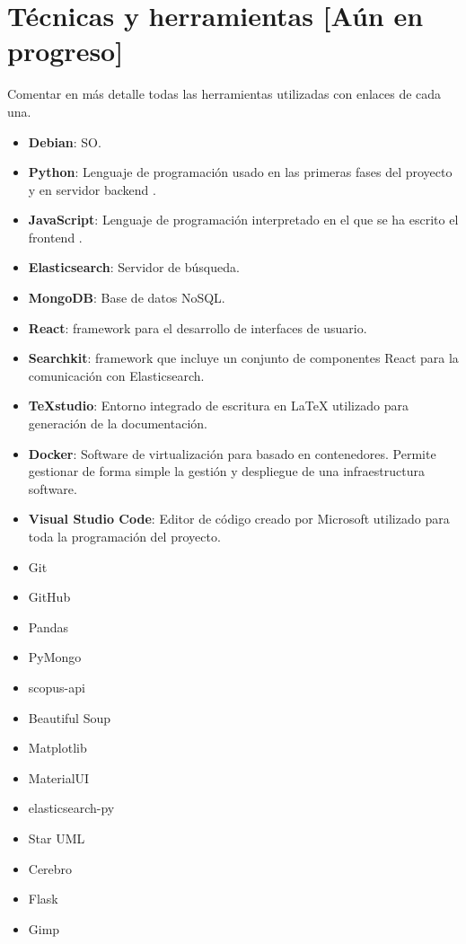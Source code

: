 \chapter{Técnicas y herramientas [Aún en progreso]}
\label{ch:herramientas}

Comentar en más detalle todas las herramientas utilizadas con enlaces de cada una.

\begin{itemize}
	\item \textbf{Debian}: \acrfull{SO}.
	\item \textbf{Python}: Lenguaje de programación usado en las primeras fases del proyecto y en servidor \gls{backend} .
	\item \textbf{JavaScript}: Lenguaje de programación interpretado en el que se ha escrito el \gls{frontend} .
	\item \textbf{Elasticsearch}: Servidor de búsqueda.
	\item \textbf{MongoDB}: Base de datos NoSQL.
	\item \textbf{React}:  \Gls{framework} para el desarrollo de interfaces de usuario.
	\item \textbf{Searchkit}: \Gls{framework} que incluye un conjunto de componentes React para la comunicación con Elasticsearch.
	\item \textbf{TeXstudio}: Entorno integrado de escritura en \LaTeX{} utilizado para generación de la documentación.
	\item \textbf{Docker}: Software de virtualización para basado en contenedores. Permite gestionar de forma simple la gestión y despliegue de una infraestructura software.
	\item \textbf{Visual Studio Code}: Editor de código creado por Microsoft utilizado para toda la programación del proyecto.
	\item Git
	\item GitHub
	\item Pandas
	\item PyMongo
	\item scopus-api
	\item Beautiful Soup
	\item Matplotlib
	\item MaterialUI
	\item elasticsearch-py
	\item Star UML
	\item Cerebro
	\item Flask
	\item Gimp
\end{itemize}